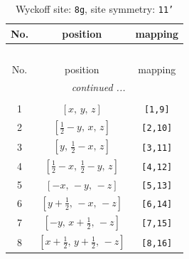 \documentclass[fleqn,8pt]{jsarticle}
\begin{document}
\renewcommand{\arraystretch}{1.2}
\begin{longtable}{ccc}
\caption{Wyckoff site: {\tt 8g}, site symmetry: {\tt 11'}}
 \\
 \hline \hline
No. & position & mapping \\ \hline \endfirsthead

\multicolumn{2}{l}{\tablename\ \thetable{}} \\
 \hline \hline
No. & position & mapping \\ \hline \endhead

 \hline \hline
\multicolumn{2}{r}{\footnotesize\it continued ...} \\ \endfoot

 \hline \hline
\multicolumn{2}{r}{} \\ \endlastfoot

1 & $\left[ x,\, y,\, z \right]$ & {\tt [1,9]} \\ \hline
2 & $\left[ \frac{1}{2} - y,\, x,\, z \right]$ & {\tt [2,10]} \\ \hline
3 & $\left[ y,\, \frac{1}{2} - x,\, z \right]$ & {\tt [3,11]} \\ \hline
4 & $\left[ \frac{1}{2} - x,\, \frac{1}{2} - y,\, z \right]$ & {\tt [4,12]} \\ \hline
5 & $\left[ - x,\, - y,\, - z \right]$ & {\tt [5,13]} \\ \hline
6 & $\left[ y + \frac{1}{2},\, - x,\, - z \right]$ & {\tt [6,14]} \\ \hline
7 & $\left[ - y,\, x + \frac{1}{2},\, - z \right]$ & {\tt [7,15]} \\ \hline
8 & $\left[ x + \frac{1}{2},\, y + \frac{1}{2},\, - z \right]$ & {\tt [8,16]} \\
\end{longtable}
\end{document}
